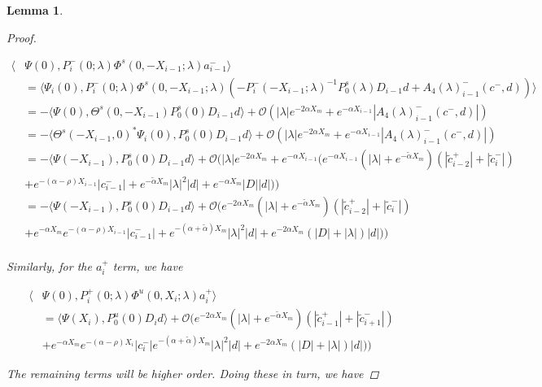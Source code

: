 \documentclass[12pt]{article}
\newtheorem{lemma}{Lemma}
\begin{document}
\begin{lemma}
\begin{proof}
\begin{enumerate}
\begin{align*}
\langle &\Psi(0), P_i^-(0; \lambda) \Phi^s(0, -X_{i-1}; \lambda) a_{i-1}^- \rangle \\
&= \langle \Psi_i(0), P_i^-(0; \lambda) \Phi^s(0, -X_{i-1}; \lambda) (- P_i^-(-X_{i-1}; \lambda)^{-1} P_0^s(\lambda) D_{i-1} d + A_4(\lambda)_{i-1}^-(c^-, d)) \rangle \\
&= -\langle \Psi(0), \Theta^s(0, -X_{i-1}) P_0^s(0) D_{i-1} d \rangle + \mathcal{O}( |\lambda|e^{-2 \alpha X_m} + e^{-\alpha X_{i-1}} |A_4(\lambda)_{i-1}^-(c^-, d)|)\\
&= -\langle \Theta^s(-X_{i-1}, 0)^* \Psi_i(0), P_0^s(0) D_{i-1} d \rangle + \mathcal{O}( |\lambda|e^{-2 \alpha X_m} + e^{-\alpha X_{i-1}} |A_4(\lambda)_{i-1}^-(c^-, d)|)\\
&= -\langle \Psi(-X_{i-1}), P_0^s(0) D_{i-1} d \rangle + \mathcal{O}\Big( |\lambda|e^{-2 \alpha X_m} + e^{-\alpha X_{i-1}} ( 
e^{-\alpha X_{i-1}}(|\lambda| + e^{-\tilde{\alpha}X_m})(|\tilde{c}_{i-2}^+| + |\tilde{c}_i^-|) \\
&+ e^{-(\alpha - \rho) X_{i-1}} |c_{i-1}^-| + e^{-\tilde{\alpha} X_m} |\lambda|^2|d| + e^{-\alpha X_m}|D||d|) \Big) \\
&= -\langle \Psi(-X_{i-1}), P_0^s(0) D_{i-1} d \rangle 
+ \mathcal{O}\Big(  
e^{-2 \alpha X_m}(|\lambda| + e^{-\tilde{\alpha}X_m})(|\tilde{c}_{i-2}^+| + |\tilde{c}_i^-|) \\
&+ e^{-\alpha X_m}e^{-(\alpha - \rho) X_{i-1}} |c_{i-1}^-| + e^{-(\alpha + \tilde{\alpha}) X_m} |\lambda|^2|d| + e^{-2 \alpha X_m}(|D| + |\lambda|)|d|) \Big) \\ 
\end{align*}

Similarly, for the $a_i^+$ term, we have

\begin{align*}
\langle &\Psi(0), P_i^+(0; \lambda) \Phi^u(0, X_i; \lambda) a_i^+ \rangle \\
&= \langle \Psi(X_i), P_0^u(0) D_i d \rangle + \mathcal{O}\Big( e^{-2 \alpha X_m} (|\lambda| + e^{-\tilde{\alpha}X_m})(|\tilde{c}_{i-1}^+| + |\tilde{c}_{i+1}^-|) \\
&+ e^{-\alpha X_m} e^{-(\alpha - \rho) X_i} |c_i^-| e^{-(\alpha + \tilde{\alpha}) X_m} |\lambda|^2|d| + e^{-2 \alpha X_m}(|D| + |\lambda|)|d|) \Big)
\end{align*}

\end{enumerate}

The remaining terms will be higher order. Doing these in turn, we have


\end{proof}
\end{lemma}
\end{document}

